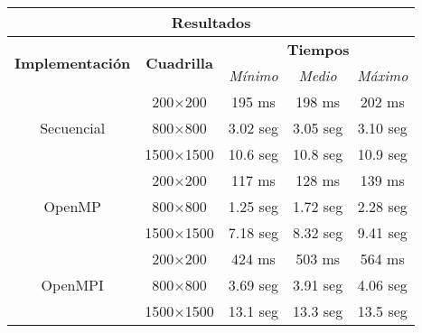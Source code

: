 \documentclass[a4paper,12pt]{article}
\begin{document}
\begin{table}[H]
    \begin{center}
        \begin{tabular}{|c|c|c|c|c|}
            \hline
            \multicolumn{5}{|c|}{\textbf{Resultados}}
            \\ \hline
            \multirow{2}{*}{\textbf{Implementación}} & \multirow{2}{*}{\textbf{Cuadrilla}}   & \multicolumn{3}{c|}{\textbf{Tiempos}}
            \\ \cline{3-5}
                                                     &                                       & \emph{Mínimo}                         & \emph{Medio} & \emph{Máximo} \\
            \hline
            \multirow{3}{*}{Secuencial}              & \multicolumn{1}{c|}{200$\times$200}   & 195 ms                                & 198 ms       & 202 ms        \\
                                                     & \multicolumn{1}{c|}{800$\times$800}   & 3.02 seg                              & 3.05 seg     & 3.10 seg      \\
                                                     & \multicolumn{1}{c|}{1500$\times$1500} & 10.6 seg                              & 10.8 seg     & 10.9 seg      \\
            \hline
            \multirow{3}{*}{OpenMP}                  & \multicolumn{1}{c|}{200$\times$200}   & 117 ms                                & 128 ms       & 139 ms        \\
                                                     & \multicolumn{1}{c|}{800$\times$800}   & 1.25 seg                              & 1.72 seg     & 2.28 seg      \\
                                                     & \multicolumn{1}{c|}{1500$\times$1500} & 7.18 seg                              & 8.32 seg     & 9.41 seg      \\
            \hline
            \multirow{3}{*}{OpenMPI}                 & \multicolumn{1}{c|}{200$\times$200}   & 424 ms                                & 503 ms       & 564 ms        \\
                                                     & \multicolumn{1}{c|}{800$\times$800}   & 3.69 seg                              & 3.91 seg     & 4.06 seg      \\
                                                     & \multicolumn{1}{c|}{1500$\times$1500} & 13.1 seg                              & 13.3 seg     & 13.5 seg      \\

\end{tabular}
\end{center}
\end{table}
\end{document}
